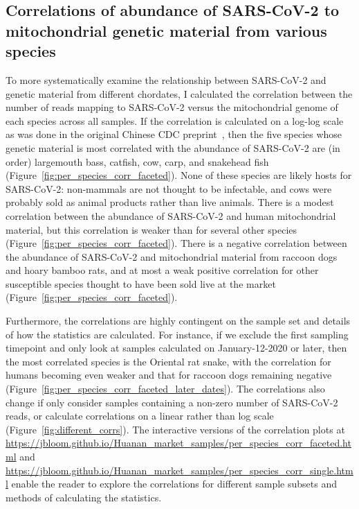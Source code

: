 \documentclass[9pt,twocolumn,twoside]{gsajnl_modified}
\begin{document}
\subsection{Correlations of abundance of SARS-CoV-2 to mitochondrial genetic material from various species}
To more systematically examine the relationship between SARS-CoV-2 and genetic material from different chordates, I calculated the correlation between the number of reads mapping to SARS-CoV-2 versus the mitochondrial genome of each species across all samples.
If the correlation is calculated on a log-log scale as was done in the original Chinese CDC preprint~\citep{liu2022surveillance}, then the five species whose genetic material is most correlated with the abundance of SARS-CoV-2 are (in order) largemouth bass, catfish, cow, carp, and snakehead fish (Figure~\ref{fig:per_species_corr_faceted}).
None of these species are likely hosts for SARS-CoV-2: non-mammals are not thought to be infectable, and cows were probably sold as animal products rather than live animals.
There is a modest correlation between the abundance of SARS-CoV-2 and human mitochondrial material, but this correlation is weaker than for several other species (Figure~\ref{fig:per_species_corr_faceted}).
There is a negative correlation between the abundance of SARS-CoV-2 and mitochondrial material from raccoon dogs and hoary bamboo rats, and at most a weak positive correlation for other susceptible species thought to have been sold live at the market (Figure~\ref{fig:per_species_corr_faceted}).

Furthermore, the correlations are highly contingent on the sample set and details of how the statistics are calculated.
For instance, if we exclude the first sampling timepoint and only look at samples calculated on January-12-2020 or later, then the most correlated species is the Oriental rat snake, with the correlation for humans becoming even weaker and that for raccoon dogs remaining negative (Figure~\ref{fig:per_species_corr_faceted_later_dates}).
The correlations also change if only consider samples containing a non-zero number of SARS-CoV-2 reads, or calculate correlations on a linear rather than log scale (Figure~\ref{fig:different_corrs}).
The interactive versions of the correlation plots at \url{https://jbloom.github.io/Huanan_market_samples/per_species_corr_faceted.html} and \url{https://jbloom.github.io/Huanan_market_samples/per_species_corr_single.html} enable the reader to explore the correlations for different sample subsets and methods of calculating the statistics.
\end{document}
